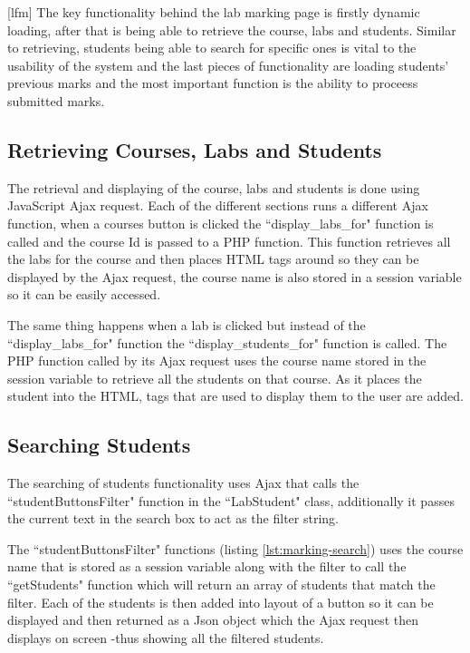 \documentclass[11pt]{report}
\begin{document}
[lfm]
The key functionality behind the lab marking page is firstly dynamic loading, after that is being able to retrieve the course, labs and students. Similar to retrieving, students being able to search for specific ones is vital to the usability of the system and the last pieces of functionality  are loading students' previous marks and the most important function is the ability to proceess submitted marks.

\subsection{Retrieving Courses, Labs and Students}

The retrieval and displaying of the course, labs and students is done using JavaScript Ajax request. Each of the different sections runs a different Ajax function, when a courses button is clicked the ``display\_labs\_for" function is called and the course Id is passed to a PHP function. This function retrieves all the labs for the course and then places HTML tags around so they can be displayed by the Ajax request, the course name is also stored in a session variable so it can be easily accessed. 

The same thing happens when a lab is clicked but instead of the ``display\_labs\_for" function the ``display\_students\_for" function is called. The PHP function called by its Ajax request uses the course name stored in the session variable to retrieve all the students on that course. As it places the student into the HTML, tags that are used to display them to the user are added.


\subsection{Searching Students}
The searching of students functionality uses Ajax that calls the ``studentButtonsFilter" function in the ``LabStudent" class, additionally it passes the current text in the search box to act as the filter string. 

The ``studentButtonsFilter" functions (listing \ref{lst:marking-search}) uses the course name that is stored as a session variable along with the filter to call the ``getStudents" function which will return an array of students that match the filter. Each of the students is then added into layout of a button so it can be displayed and then returned as a Json object which the Ajax request then displays on screen -thus showing all the filtered students.
\end{document}
